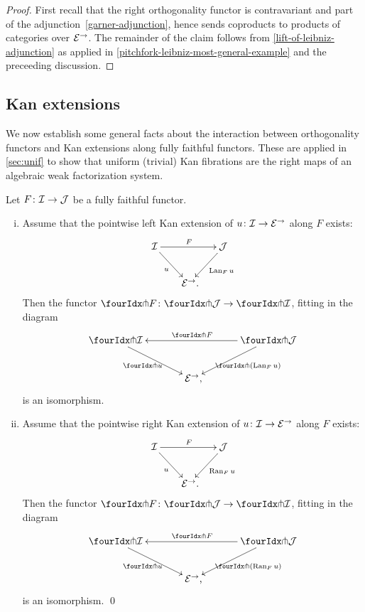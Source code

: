 \documentclass[reqno,10pt,a4paper,oneside,draft]{amsart}
\begin{document}
\begin{proof}
First recall that the right orthogonality functor is contravariant and part of the adjunction~\eqref{garner-adjunction}, hence sends coproducts to products of categories over $\mathcal{E}^\to$.
The remainder of the claim follows from \cref{lift-of-leibniz-adjunction} as applied in \cref{pitchfork-leibniz-most-general-example} and the preceeding discussion.
\end{proof}

\subsection*{Kan extensions}

We now establish some general facts about the interaction between orthogonality functors and Kan extensions along fully faithful functors. These are applied in \cref{sec:unif} to show that uniform (trivial) Kan fibrations are the right maps of an algebraic weak factorization system.

\begin{proposition} \label{kan-extension-closure}
Let $F \colon \mathcal{I} \to \mathcal{J}$ be a fully faithful functor.
\begin{enumerate}[(i)]
\item Assume that the pointwise left Kan extension of $u \colon \mathcal{I} \to \mathcal{E}^\to$ along $F$ exists:
\[
\xymatrix@!C@C-1em{
  \cal{I}
  \ar[dr]_{u}
  \ar[rr]^{F}
&&
  \cal{J}
  \ar[dl]^{\Lan_F u}
\\&
  \catE^\to
\rlap{.}}
\]
Then the functor $\liftr{F} \co \liftr{\cal{J}} \to \liftr{\cal{I}}$, fitting in the diagram
\[
\xymatrix@!C@C-1em{
  \liftr{\cal{I}}
  \ar[dr]_{\liftr{u}}
&&
  \liftr{\cal{J}}
  \ar[ll]_{\liftr{F}}
  \ar[dl]^{\liftr{(\Lan_F u)}}
\\&
  \catE^\to
\rlap{,}}
\]
is an isomorphism.
\item Assume that the pointwise right Kan extension of $u \colon \mathcal{I} \to \mathcal{E}^\to$ along $F$ exists:
\[
\xymatrix@!C@C-1em{
  \cal{I}
  \ar[dr]_{u}
  \ar[rr]^{F}
&&
  \cal{J}
  \ar[dl]^{\Ran_F u}
\\&
  \catE^\to
\rlap{.}}
\]
Then the functor $\liftl{F} \co \liftl{\cal{J}} \to \liftl{\cal{I}}$, fitting in the diagram
\[
\xymatrix@!C@C-1em{
  \liftl{\cal{I}}
  \ar[dr]_{\liftl{u}}
&&
  \liftl{\cal{J}}
  \ar[ll]_{\liftl{F}}
  \ar[dl]^{\liftl{(\Ran_F u)}}
\\&
  \catE^\to
\rlap{,}}
\]
is an isomorphism.
\qed
\end{enumerate}
\end{proposition}
\end{document}
